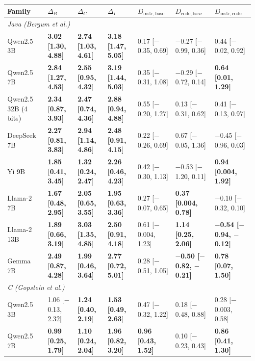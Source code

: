 \begin{tabular}{lllllll}
\toprule
Family & $\Delta_B$ & $\Delta_C$ & $\Delta_I$ & $D_{\mathrm{instr},\mathrm{base}}$ & $D_{\mathrm{code},\mathrm{base}}$ & $D_{\mathrm{instr},\mathrm{code}}$ \\
\midrule
\multicolumn{7}{l}{\textit{Java (Bergum et al.)}} \\
Qwen2.5 3B & \textbf{3.02 [1.30, 4.88]} & \textbf{2.74 [1.03, 4.61]} & \textbf{3.18 [1.47, 5.05]} & 0.17 [$-$0.35, 0.69] & $-$0.27 [$-$0.99, 0.36] & 0.44 [$-$0.02, 0.92] \\
Qwen2.5 7B & \textbf{2.84 [1.27, 4.53]} & \textbf{2.55 [0.95, 4.32]} & \textbf{3.19 [1.44, 5.03]} & 0.35 [$-$0.31, 1.08] & $-$0.29 [$-$0.72, 0.14] & \textbf{0.64 [0.01, 1.29]} \\
Qwen2.5 32B (4 bits) & \textbf{2.34 [0.87, 3.93]} & \textbf{2.47 [0.74, 4.36]} & \textbf{2.88 [0.94, 4.88]} & 0.55 [$-$0.20, 1.27] & 0.13 [$-$0.31, 0.62] & 0.41 [$-$0.13, 0.97] \\
DeepSeek 7B & \textbf{2.27 [0.81, 3.83]} & \textbf{2.94 [1.14, 4.86]} & \textbf{2.48 [0.91, 4.15]} & 0.22 [$-$0.26, 0.69] & 0.67 [$-$0.05, 1.36] & $-$0.45 [$-$0.96, 0.03] \\
Yi 9B & \textbf{1.85 [0.41, 3.45]} & \textbf{1.32 [0.24, 2.47]} & \textbf{2.26 [0.46, 4.23]} & 0.42 [$-$0.30, 1.13] & $-$0.53 [$-$1.20, 0.11] & \textbf{0.94 [0.004, 1.92]} \\
Llama-2 7B & \textbf{1.67 [0.48, 2.95]} & \textbf{2.05 [0.65, 3.55]} & \textbf{1.95 [0.63, 3.36]} & 0.27 [$-$0.07, 0.65] & \textbf{0.37 [0.004, 0.78]} & $-$0.10 [$-$0.32, 0.10] \\
Llama-2 13B & \textbf{1.89 [0.66, 3.19]} & \textbf{3.03 [1.35, 4.85]} & \textbf{2.50 [0.91, 4.18]} & 0.61 [$-$0.004, 1.23] & \textbf{1.14 [0.25, 2.06]} & \textbf{$-$0.54 [$-$0.94, $-$0.12]} \\
Gemma 7B & \textbf{2.49 [0.87, 4.28]} & \textbf{1.99 [0.46, 3.64]} & \textbf{2.77 [0.72, 5.01]} & 0.28 [$-$0.51, 1.05] & \textbf{$-$0.50 [$-$0.82, $-$0.21]} & \textbf{0.78 [0.07, 1.50]} \\
\multicolumn{7}{l}{\textit{C (Gopstein et al.)}} \\
Qwen2.5 3B & 1.06 [$-$0.13, 2.32] & \textbf{1.24 [0.40, 2.19]} & \textbf{1.53 [0.49, 2.63]} & 0.47 [$-$0.32, 1.22] & 0.18 [$-$0.48, 0.88] & 0.28 [$-$0.003, 0.58] \\
Qwen2.5 7B & \textbf{0.99 [0.25, 1.79]} & \textbf{1.10 [0.24, 2.04]} & \textbf{1.96 [0.82, 3.20]} & \textbf{0.96 [0.43, 1.52]} & 0.10 [$-$0.23, 0.43] & \textbf{0.86 [0.41, 1.30]} \\

\end{tabular}
